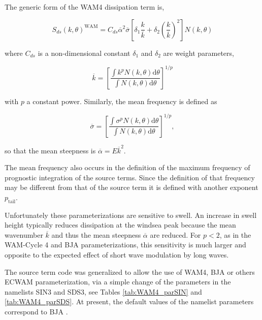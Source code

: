 The generic form of the WAM4 dissipation term is,

\begin{equation}
S_{ds}\left(k,\theta\right)^{\mathrm{WAM}} = C_{ds} \overline{\alpha}^2
 \overline{\sigma} \left[\delta_1 \frac{k}{\overline{k}} + \delta_2
\left(\frac{k}{\overline{k}}\right)^2\right]\label{eq:SdsWAM4}
N\left(k,\theta\right)
\end{equation}

\noindent
where $C_{ds}$ is a non-dimensional constant $\delta_1$ and $\delta_2$ are
weight parameters,

\begin{equation}
\overline{k}=\left[\frac{\int k^p N\left(k,\theta\right) {\mathrm d}
\theta}{\int N\left(k,\theta\right) {\mathrm d} \theta}\right]^{1/p}
\end{equation}

\noindent
with $p$ a constant power. Similarly, the mean frequency is defined as

\begin{equation}
\overline{\sigma}=\left[\frac{\int \sigma^p N\left(k,\theta\right) {\mathrm d}
\theta}{ \int N\left(k,\theta\right) {\mathrm d} \theta}\right]^{1/p},
\end{equation}

\noindent
so that the mean steepness is $\overline{\alpha}=E \overline{k}^2$.

The mean frequency also occurs in the definition of the maximum frequency of
prognostic integration of the source terms. Since the definition of that
frequency may be different from that of the source term it is defined with
another exponent $p_{\mathrm{tail}}$.

Unfortunately these parameterizations are sensitive to swell. An increase in
swell height typically reduces dissipation at the windsea peak because the mean wavenumber $\overline{k}$ and 
thus the mean steepness $\overline{\alpha}$ are reduced. For $p< 2$, as in the WAM-Cycle 4 and BJA
parameterizations, this sensitivity is much larger and opposite to the expected effect of
short wave modulation by long waves.

The source term code was generalized to
allow the use of WAM4, BJA or others ECWAM parameterization, via a simple change of
the parameters in the namelists {\F SIN3} and {\F SDS3}, see Tables \ref{tab:WAM4_parSIN} and \ref{tab:WAM4_parSDS}. At present, the default values of the namelist
parameters correspond to BJA \citep{rep:Bea05}.

